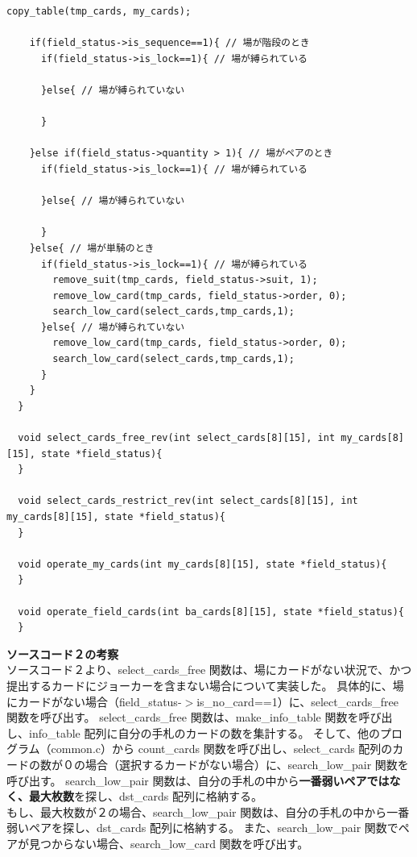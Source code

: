 \documentclass[]{jsarticle}
\begin{document}
\begin{lstlisting}[caption={select\_cards.c}]
    copy_table(tmp_cards, my_cards); 
  
    if(field_status->is_sequence==1){ // 場が階段のとき
      if(field_status->is_lock==1){ // 場が縛られている
  
      }else{ // 場が縛られていない
  
      }
  
    }else if(field_status->quantity > 1){ // 場がペアのとき
      if(field_status->is_lock==1){ // 場が縛られている
  
      }else{ // 場が縛られていない
  
      }
    }else{ // 場が単騎のとき
      if(field_status->is_lock==1){ // 場が縛られている
        remove_suit(tmp_cards, field_status->suit, 1);
        remove_low_card(tmp_cards, field_status->order, 0); 
        search_low_card(select_cards,tmp_cards,1); 
      }else{ // 場が縛られていない
        remove_low_card(tmp_cards, field_status->order, 0); 
        search_low_card(select_cards,tmp_cards,1); 
      }
    }
  }
  
  void select_cards_free_rev(int select_cards[8][15], int my_cards[8][15], state *field_status){
  }
  
  void select_cards_restrict_rev(int select_cards[8][15], int my_cards[8][15], state *field_status){
  }
  
  void operate_my_cards(int my_cards[8][15], state *field_status){
  }
  
  void operate_field_cards(int ba_cards[8][15], state *field_status){
  }
\end{lstlisting}

\vspace*{1\baselineskip}
\noindent\textbf{ソースコード２の考察}\\
\indent ソースコード２より、select\_cards\_free 関数は、場にカードがない状況で、かつ提出するカードにジョーカーを含まない場合について実装した。
具体的に、場にカードがない場合（field\_status-\(>\)is\_no\_card==1）に、select\_cards\_free 関数を呼び出す。
select\_cards\_free 関数は、make\_info\_table 関数を呼び出し、info\_table 配列に自分の手札のカードの数を集計する。
そして、他のプログラム（common.c）から count\_cards 関数を呼び出し、select\_cards 配列のカードの数が０の場合（選択するカードがない場合）に、search\_low\_pair 関数を呼び出す。
search\_low\_pair 関数は、自分の手札の中から\textbf{一番弱いペアではなく、最大枚数}を探し、dst\_cards 配列に格納する。\\
もし、最大枚数が２の場合、search\_low\_pair 関数は、自分の手札の中から一番弱いペアを探し、dst\_cards 配列に格納する。
また、search\_low\_pair 関数でペアが見つからない場合、search\_low\_card 関数を呼び出す。
\end{document}
